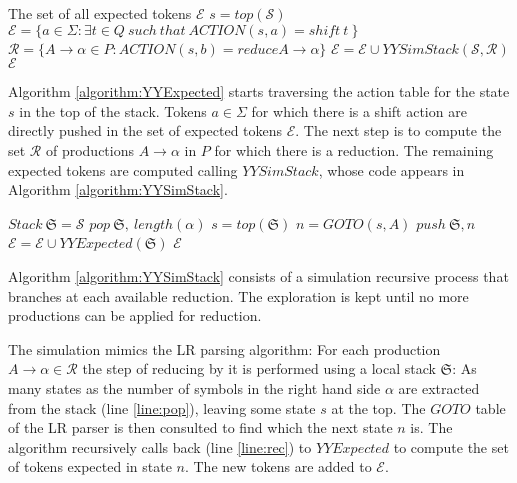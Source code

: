 \begin{algorithm}[h] 
\caption{$YYExpected(\mathcal{S})$}
\label{algorithm:YYExpected}
\begin{algorithmic}%
\ENSURE The set of all expected tokens $\mathcal{E}$
\STATE $s = top(\mathcal{S})$
\STATE  $\mathcal{E} = \{ a \in \Sigma : \exists t \in Q\ such\ that\ ACTION(s, a) = shift\ t\ \}$
\STATE  $\mathcal{R} = \{  A \rightarrow \alpha \in P : ACTION(s, b) = reduce  A \rightarrow \alpha \}$
  \STATE $\mathcal{E} = \mathcal{E} \cup YYSimStack(\mathcal{S}, \mathcal{R})$
\ENDIF
\RETURN $\mathcal{E}$
\end{algorithmic}
\end{algorithm}
Algorithm \ref{algorithm:YYExpected}  starts traversing the action table for the
state $s$ in the top of the stack. Tokens $a \in \Sigma$ 
for which there is a shift action 
are directly pushed in the set of expected 
tokens $\mathcal{E}$. 
The next step is to compute the set $\mathcal{R}$ of productions $A \rightarrow \alpha$  in
$P$ for which there
is a reduction. The remaining expected tokens
are computed calling $YYSimStack$, whose code appears in
Algorithm \ref{algorithm:YYSimStack}.


\begin{algorithm}[h]
\caption{$YYSimStack(\mathcal{S}, \mathcal{R})$}
\label{algorithm:YYSimStack}
\begin{algorithmic}[1]
      \STATE $Stack\ \mathfrak{S} = \mathcal{S}$
      \STATE \label{line:pop} $pop\ \mathfrak{S},\  length(\alpha)$
      \STATE $s = top(\mathfrak{S})$
      \STATE $n = GOTO(s, A)$
      \STATE $push\ \mathfrak{S}, n$
      \STATE \label{line:rec}$\mathcal{E} = \mathcal{E} \cup YYExpected(\mathfrak{S})$
    \ENDIF
 \ENDFOR
 \RETURN $\mathcal{E}$
\end{algorithmic}
\end{algorithm}

Algorithm \ref{algorithm:YYSimStack} 
consists of a simulation recursive process that 
branches at each available reduction.
The exploration is kept until no more 
productions can be applied for reduction.

The simulation mimics the LR parsing algorithm:
For each production $A \rightarrow \alpha \in \mathcal{R}$
the step of reducing by it is performed using a local stack 
$\mathfrak{S}$: As many states as the number of symbols in  the right hand side 
$\alpha$ are extracted from the stack (line \ref{line:pop}), leaving some state $s$ at the top.
The $GOTO$ table of the LR parser is then consulted to find which the 
next state $n$ is. The algorithm recursively calls back (line \ref{line:rec}) to 
$YYExpected$ %
 to compute
the set of tokens expected in state $n$. The new tokens are added
to $\mathcal{E}$.
